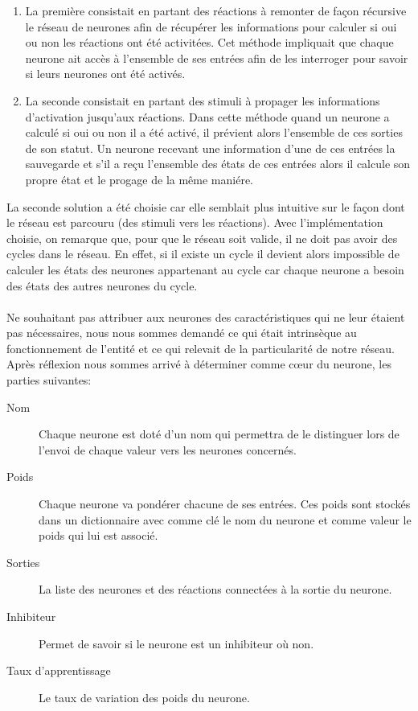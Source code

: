 \begin{enumerate}
  \item La première consistait en partant des réactions à remonter de façon
    récursive le réseau de neurones afin de récupérer les informations pour
    calculer si oui ou non les réactions ont été activitées. Cet méthode impliquait
    que chaque neurone ait accès à l'ensemble de ses entrées afin de les
    interroger pour savoir si leurs neurones ont été activés.
  \item La seconde consistait en partant des stimuli à propager les informations
    d'activation jusqu'aux réactions. Dans cette méthode quand un neurone a calculé
    si oui ou non il a été activé, il prévient alors l'ensemble de ces sorties de
    son statut. Un neurone recevant une information d'une de ces entrées la
    sauvegarde et s'il a reçu l'ensemble des états de ces entrées alors il calcule
    son propre état et le progage de la même maniére.
\end{enumerate}

La seconde solution a été choisie car elle semblait plus intuitive sur le
façon dont le réseau est parcouru (des stimuli vers les réactions). Avec
l'implémentation choisie, on remarque que, pour que le réseau soit valide,
il ne doit pas avoir des cycles dans le réseau. En effet, si il existe un
cycle il devient alors impossible de calculer les états des neurones
appartenant au cycle car chaque neurone a besoin des états des autres neurones du
cycle.

\paragraph{}
Ne souhaitant pas attribuer aux neurones des caractéristiques qui ne leur étaient
pas nécessaires, nous nous sommes demandé ce qui était intrinsèque au
fonctionnement de l'entité et ce qui relevait de la particularité de notre
réseau. Après réflexion nous sommes arrivé à déterminer comme cœur du neurone, les
parties suivantes:\\

\begin{description}
  \item[Nom] Chaque neurone est doté d'un nom qui permettra de le distinguer
    lors de l'envoi de chaque valeur vers les neurones concernés.
  \item[Poids] Chaque neurone va pondérer chacune de ses entrées. Ces poids
    sont stockés dans un dictionnaire avec comme clé le nom du neurone et
    comme valeur le poids qui lui est associé.
  \item[Sorties] La liste des neurones et des réactions connectées à la sortie
    du neurone.
  \item[Inhibiteur] Permet de savoir si le neurone est un inhibiteur où non.
  \item[Taux d'apprentissage] Le taux de variation des poids du neurone.
\end{description}

\paragraph{}


